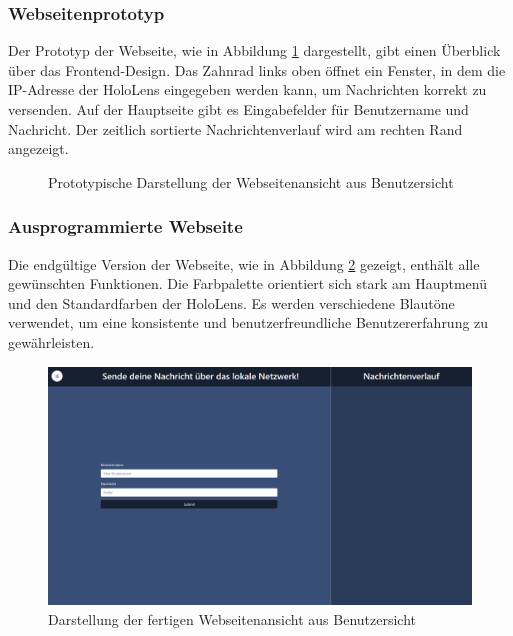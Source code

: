 \subsubsection*{Webseitenprototyp}
Der Prototyp der Webseite, wie in Abbildung \ref{fig:protfrontend} dargestellt, gibt einen Überblick über das
Frontend-Design. Das Zahnrad links oben öffnet ein Fenster, in dem die IP-Adresse der HoloLens eingegeben werden kann,
um Nachrichten korrekt zu versenden. Auf der Hauptseite gibt es Eingabefelder für Benutzername und Nachricht. Der zeitlich
sortierte Nachrichtenverlauf wird am rechten Rand angezeigt.

\begin{figure}[H]
    \centering
    \caption{Prototypische Darstellung der Webseitenansicht aus Benutzersicht}
    \label{fig:protfrontend}
\end{figure}

\subsubsection*{Ausprogrammierte Webseite}
Die endgültige Version der Webseite, wie in Abbildung \ref{fig:frontend} gezeigt, enthält alle gewünschten Funktionen.
Die Farbpalette orientiert sich stark am Hauptmenü und den Standardfarben der HoloLens. Es werden verschiedene Blautöne
verwendet, um eine konsistente und benutzerfreundliche Benutzererfahrung zu gewährleisten.

\begin{figure}[H]
    \centering
    \includegraphics[width=1\textwidth]{images/frontend.png}
    \caption{Darstellung der fertigen Webseitenansicht aus Benutzersicht}
    \label{fig:frontend}
\end{figure}

